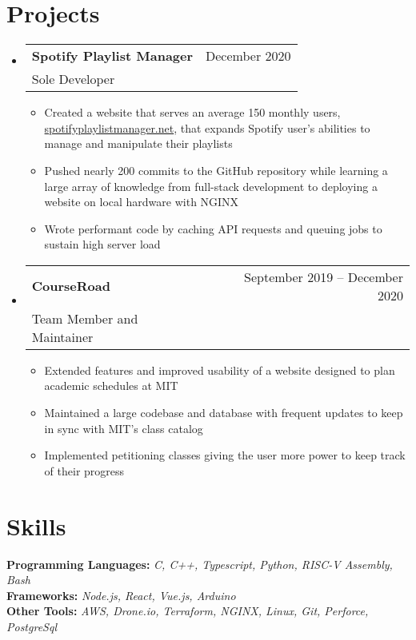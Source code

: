 \documentclass[letterpaper,12pt]{article} %
\makeatletter
\newcommand{\CVItem}[1]{
  \item\small{
    {#1 \vspace{-2pt}}
  }
}
\newcommand{\CVSubheading}[4]{
  \vspace{-2pt}\item
    \begin{tabular*}{0.97\textwidth}[t]{l@{\extracolsep{\fill}}r}
      \textbf{#1} & #2 \\
      \small#3 & \small #4 \\
    \end{tabular*}\vspace{-7pt}
}
\newcommand{\CVSubHeadingListStart}{\begin{itemize}[leftmargin=0.15in, label={}]} %
\newcommand{\CVSubHeadingListEnd}{\end{itemize}}
\newcommand{\CVItemListStart}{\begin{itemize}}
\newcommand{\CVItemListEnd}{\end{itemize}\vspace{-5pt}}
\makeatother
\begin{document}
\section{Projects}
\CVSubHeadingListStart
\CVSubheading
{Spotify Playlist Manager}{December 2020}
{Sole Developer}{}
\CVItemListStart
\CVItem{Created a website that serves an average 150 monthly users, \href{www.spotifyplaylistmanager.net}{spotifyplaylistmanager.net},
  that expands Spotify user's abilities to manage and manipulate their playlists}
\CVItem{Pushed nearly 200 commits to the GitHub repository
while learning a large array of knowledge from full-stack development to deploying a website on local hardware with NGINX}
\CVItem{Wrote performant code by caching API requests and queuing jobs to sustain high server load}
\CVItemListEnd
\CVSubheading
{CourseRoad}{September 2019 -- December 2020}
{Team Member and Maintainer}{}
\CVItemListStart
\CVItem{Extended features and improved usability of a website designed to plan academic schedules at MIT}
\CVItem{Maintained a large codebase and database with frequent updates to keep in sync with MIT's class catalog}
\CVItem{Implemented petitioning classes giving the user more power to keep track of their progress}
\CVItemListEnd
\CVSubHeadingListEnd

\vspace{-10pt} %

\section{Skills}
\begin{itemize}[leftmargin=0.15in, label={}]
  \small{\item{
        \textbf{Programming Languages: }{\emph{C, C++, Typescript, Python, RISC-V Assembly, Bash}} \\
        \textbf{Frameworks: }{\emph{Node.js, React, Vue.js, Arduino}}\\
        \textbf{Other Tools: }{\emph{AWS, Drone.io, Terraform, NGINX, Linux, Git, Perforce, PostgreSql}} \\
        }}
\end{itemize}

\end{document}
